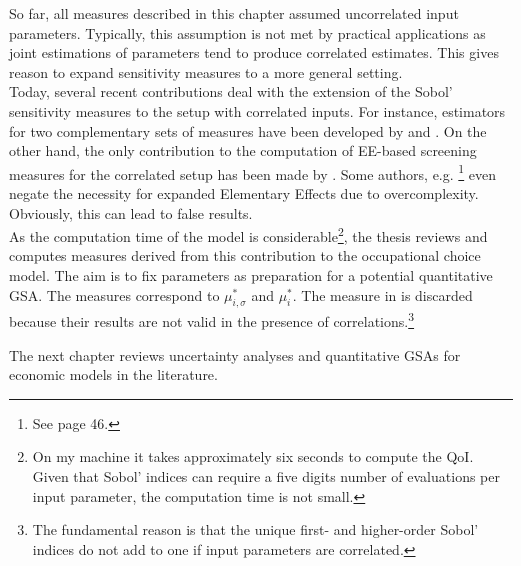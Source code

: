 \documentclass[a4paper,12pt]{article}
\begin{document}
So far, all measures described in this chapter assumed uncorrelated input parameters. Typically, this assumption is not met by practical applications as joint estimations of parameters tend to produce correlated estimates. This gives reason to expand sensitivity measures to a more general setting.\\

\noindent
Today, several recent contributions deal with the extension of the Sobol' sensitivity measures to the setup with correlated inputs. For instance, estimators for two complementary sets of measures have been developed by \cite{kucherenko2012estimation} and \cite{mara2015non}.
On the other hand, the only contribution to the computation of EE-based screening measures for the correlated setup has been made by \cite{ge2017extending}. Some authors, e.g. \cite{Saltelli.2004}\footnote{See page 46.} even negate the necessity for expanded Elementary Effects due to overcomplexity. Obviously, this can lead to false results.\\

\noindent
As the computation time of the \cite{Keane.1994} model is considerable\footnote{On my machine it takes approximately six seconds to compute the QoI. Given that Sobol' indices can require a five digits number of evaluations per input parameter, the computation time is not small.}, the thesis reviews \cite{ge2017extending} and computes measures derived from this contribution to the occupational choice model. The aim is to fix parameters as preparation for a potential quantitative GSA. The measures correspond to $\mu_{i,\sigma}^*$ and $\mu_{i}^*$. The measure in \citeauthor{kucherenko2009derivative} is discarded because their results are not valid in the presence of correlations.\footnote{The fundamental reason is that the unique first- and higher-order Sobol' indices do not add to one if input parameters are correlated.}

The next chapter reviews uncertainty analyses and quantitative GSAs for economic models in the literature. 

\newpage

\end{document}
